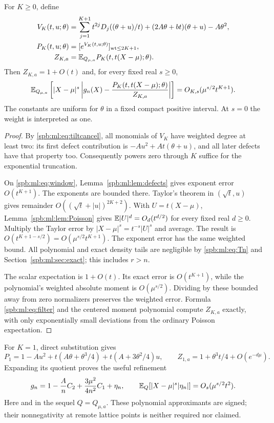 \begin{theorem}\label{spb:ml:thm:density}
For $K\ge0$, define
\begin{align*}
 V_K(t,u;\theta)&=\sum_{j=1}^{K+1}t^{2j}D_j((\theta+u)/t)
          +(2A\theta+bt)(\theta+u)-A\theta^2,\\
 P_K(t,u;\theta)&=[e^{V_K(t,u;\theta)}]_{\operatorname{wt}\le2K+1},\\
 Z_{K,a}&=\mathbb E_{Q_{\mu,a}}P_K(t,t(X-\mu);\theta).
\end{align*}
Then $Z_{K,a}=1+O(t)$ and, for every fixed real $s\ge0$,
\begin{equation}\label{spb:ml:eq:weighteddensity}
 \mathbb E_{Q_{\mu,a}}\left[|X-\mu|^s
 \left|g_n(X)-\frac{P_K(t,t(X-\mu);\theta)}{Z_{K,a}}\right|\right]
 =O_{K,s}(\mu^{s/2}t^{K+1}).
\end{equation}
The constants are uniform for $\theta$ in a fixed compact positive interval. At $s=0$ the weight is interpreted as one.
\end{theorem}
\begin{proof}
By \eqref{spb:ml:eq:tiltcancel}, all monomials of $V_K$ have weighted degree at least two: its first defect contribution is $-Au^2+At(\theta+u)$, and all later defects have that property too. Consequently powers zero through $K$ suffice for the exponential truncation.

On \eqref{spb:ml:eq:window}, Lemma~\ref{spb:ml:lem:defects} gives exponent error $O(t^{K+1})$. The exponents are bounded there. Taylor's theorem in $(\sqrt t,u)$ gives remainder $O((\sqrt t+|u|)^{2K+2})$. With $U=t(X-\mu)$, Lemma~\ref{spb:ml:lem:Poisson} gives $\mathbb E|U|^d=O_d(t^{d/2})$ for every fixed real $d\ge0$. Multiply the Taylor error by $|X-\mu|^s=t^{-s}|U|^s$ and average. The result is $O(t^{K+1-s/2})=O(\mu^{s/2}t^{K+1})$. The exponent error has the same weighted bound. All polynomial and exact density tails are negligible by \eqref{spb:ml:eq:Tn} and Section~\ref{spb:ml:sec:exact}; this includes $r>n$.

The scalar expectation is $1+O(t)$. Its exact error is $O(t^{K+1})$, while the polynomial's weighted absolute moment is $O(\mu^{s/2})$. Dividing by these bounded away from zero normalizers preserves the weighted error. Formula \eqref{spb:ml:eq:filter} and the centered moment polynomial compute $Z_{K,a}$ exactly, with only exponentially small deviations from the ordinary Poisson expectation.
\end{proof}

For $K=1$, direct substitution gives
\[
 P_1=1-Au^2+t(A\theta+\theta^3/4)+t(A+3\theta^2/4)u,
 \qquad Z_{1,a}=1+\theta^3t/4+O(e^{-d\mu}).
\]
Expanding its quotient proves the useful refinement
\begin{equation}\label{spb:ml:eq:firstdensity}
 g_n=1-\frac{A}{n}C_2+
       \frac{3\mu^2}{4n^2}C_1+\eta_n,\qquad
 \mathbb E_Q[|X-\mu|^s|\eta_n|]=O_s(\mu^{s/2}t^2).
\end{equation}
Here and in the sequel $Q=Q_{\mu,a}$. These polynomial approximants are signed; their nonnegativity at remote lattice points is neither required nor claimed.

